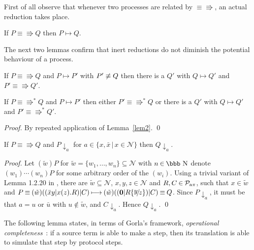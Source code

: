\documentclass[runningheads]{llncs}
\newcommand{\T}{\mathcal{P}}             %
\newcommand{\bbT}{\T}
\newcommand{\subs}[2]{\{\mathord{\raisebox{2pt}[0pt]{$#1$}\!/\!#2}\}} %
\newcommand{\equred}{\mathrel{\equiv}}
\newcommand{\scomm}{\sbarb}
\newcommand{\sbarb}[1]{{\downarrow_{#1}}}
\newcommand{\pima}{{\rm a\pi}}
\begin{document}
\noindent
First of all observe that whenever two processes are related by $\equiv\!\Rrightarrow$, an actual
reduction takes place.

\begin{lemma}[\cite{vG18a}]\label{lem1}\rm
If $P \equiv\!\Rrightarrow Q$ then $P \longmapsto Q$.
\end{lemma}

\noindent
The next two lemmas confirm that inert reductions do not diminish the
potential behaviour of a process.
\begin{lemma}[\cite{vG18a}]\label{lem2}\rm
If $P \equiv\!\Rrightarrow Q$ and $P \longmapsto P'$ with $P'\not\equred Q$
then there is a $Q'$ with $Q \longmapsto Q'$ and $P' \equiv\!\Rrightarrow Q'$.
\end{lemma}
\begin{corollary}\label{lem2 transitive}\rm
If $P \equiv\!\Rrightarrow^* Q$ and $P \longmapsto P'$
then either $P'\mathbin{\equiv\!\Rrightarrow^*} Q$ or there is a $Q'$ with $Q \longmapsto Q'$ and $P' \equiv\!\Rrightarrow^* Q'$.
\end{corollary}
\begin{proof}
By repeated application of Lemma~\ref{lem2}.
\qed
\end{proof}

\begin{lemma}\label{postponed barbs}\rm
If $P \equiv\!\Rrightarrow Q$ and $P \scomm a$ for $a \in \{ x, \bar x \,|\, x \in \mathcal N \}$
then $Q \scomm a$.
\end{lemma}
\begin{proof}
\newcommand{\rn}{z}
\newcommand{\un}{y}
Let $(\tilde w)P$ for $\tilde w \mathbin=\{w_1,\dots,w_n\}\mathbin\subseteq \mathcal{N}$
with $n\mathbin\in\mbox{\bbb N}$ denote $(w_1)\cdots(w_n)P$ for some
arbitrary order of the $(w_i)$.
Using a trivial variant of Lemma 1.2.20 in \cite{SW01book},
there are
$\tilde w \subseteq\mathcal{N}$, $x,\un,\rn\mathbin\in\mathcal{N}$
and $R,C\mathbin\in\bbT_{\pima}$, such that $x\in\tilde w$ and
$P \mathbin{\equred} (\tilde w)((\bar x \un | x(\rn) . R) | C ) \mathbin{\longmapsto}
(\tilde w)(( \bm{0} | R\subs{\un}{\rn}) | C ) \mathbin{\equred} Q$.
Since $P{\sbarb{a}}$, it must be that $a{=}u$ or $\bar u$ with $u\notin\tilde w$, and
$C{\sbarb{a}}$. Hence $Q{\sbarb{a}}$.
\qed
\end{proof}

\noindent
The following lemma states, in terms of Gorla's framework, {\em operational completeness}~\cite{Gorla10a}:
if a source term is able to make a step, then its translation is able to simulate that step by protocol steps.
\end{document}
